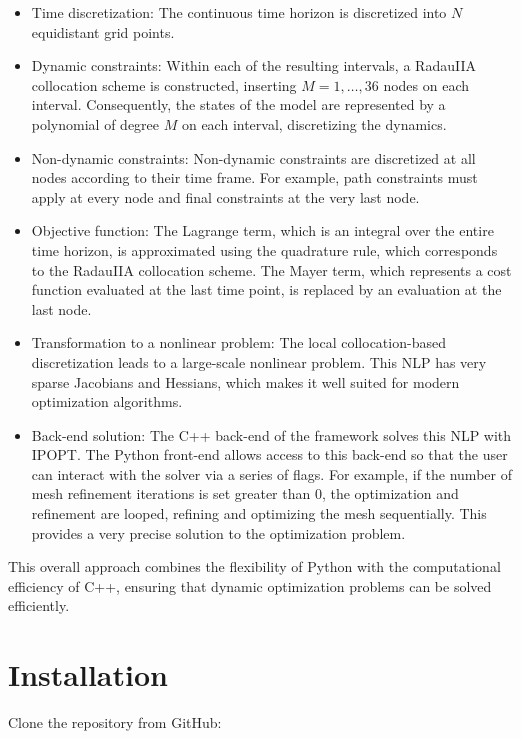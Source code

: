 \documentclass[12pt]{article}
\begin{document}
\begin{itemize}
	
	\item Time discretization:
	The continuous time horizon is discretized into $N$ equidistant grid points.
	
	\item {Dynamic constraints}:
	Within each of the resulting intervals, a RadauIIA collocation scheme is constructed, inserting $M = 1, \ldots, 36$ nodes on each interval. Consequently, the states of the model are represented by a polynomial of degree $M$ on each interval, discretizing the dynamics.
	
	\item {Non-dynamic constraints}:
	Non-dynamic constraints are discretized at all nodes according to their time frame. For example, path constraints must apply at every node and final constraints at the very last node.
	
	\item {Objective function}:
	The Lagrange term, which is an integral over the entire time horizon, is approximated using the quadrature rule, which corresponds to the RadauIIA collocation scheme.
	The Mayer term, which represents a cost function evaluated at the last time point, is replaced by an evaluation at the last node.
	
	\item {Transformation to a nonlinear problem}:
	The local collocation-based discretization leads to a large-scale nonlinear problem. This NLP has very sparse Jacobians and Hessians, which makes it well suited for modern optimization algorithms.
	
	\item {Back-end solution}:
	The C++ back-end of the framework solves this NLP with IPOPT. The Python front-end allows access to this back-end so that the user can interact with the solver via a series of flags. For example, if the number of mesh refinement iterations is set greater than 0, the optimization and refinement are looped, refining and optimizing the mesh sequentially. This provides a very precise solution to the optimization problem.
	
\end{itemize}
This overall approach combines the flexibility of Python with the computational efficiency of C++, ensuring that dynamic optimization problems can be solved efficiently.

\section{Installation}
Clone the repository from GitHub:
\end{document}
